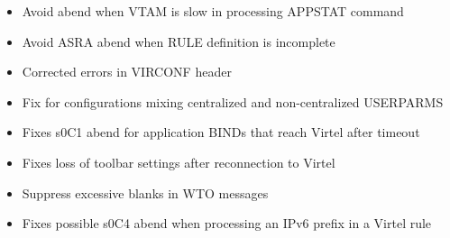 \documentclass[letterpaper,10pt,english]{sphinxmanual}
\begin{document}
\begin{itemize}
\item {} 
Avoid abend when VTAM is slow in processing APPSTAT command

\end{itemize}

\begin{itemize}
\item {} 
Avoid ASRA abend when RULE definition is incomplete

\end{itemize}

\begin{itemize}
\item {} 
Corrected errors in VIRCONF header

\end{itemize}

\begin{itemize}
\item {} 
Fix for configurations mixing centralized and non-centralized USERPARMS

\end{itemize}

\begin{itemize}
\item {} 
Fixes s0C1 abend for application BINDs that reach Virtel after timeout

\end{itemize}

\begin{itemize}
\item {} 
Fixes loss of toolbar settings after reconnection to Virtel

\end{itemize}

\begin{itemize}
\item {} 
Suppress excessive blanks in WTO messages

\end{itemize}

\begin{itemize}
\item {} 
Fixes possible s0C4 abend when processing an IPv6 prefix in a Virtel rule

\end{itemize}
\end{document}
